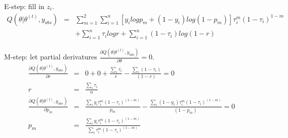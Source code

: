 \documentclass[a4paper,10pt]{article}
\begin{document}
E-step: fill in $z_i$.
\begin{eqnarray*}
Q(\theta | \theta^{(t)}, y_{obs} ) &=& \sum_{m=1}^2 \sum_{i=1}^n [y_i log p_m + (1-y_i) log(1-p_m)] \tau_i^m (1-\tau_i)^{1-m} \\
&& + \sum_{i=1}^n \tau_i log r + \sum_{i=1}^n (1-\tau_i) log (1-r)
\end{eqnarray*}

M-step: let partial derivatures $\frac{\partial Q(\theta | \theta^{(t)}, y_{obs} ) } {\partial \theta} = 0$.
\begin{eqnarray}
\frac{\partial Q(\theta | \theta^{(t)}, y_{obs} ) } {\partial r} & = & 0 + 0 + \frac{\sum_i\tau_i}{r} - \frac{\sum_i(1-\tau_i)}{(1-r)}= 0 \nonumber \\
r & = & \frac{\sum_i \tau_i}{n} \\
\frac{\partial Q(\theta | \theta^{(t)}, y_{obs} ) } {\partial p_m } & = & \frac{\sum_i y_i\tau_i^m (1-\tau_i)^{(1-m)} }{p_m} - \frac{\sum_i (1-y_i)\tau_i^m (1-\tau_i)^{(1-m)}}{(1-p_m)} = 0 \nonumber \\
p_m & = & \frac{\sum_i y_i \tau_i^m (1-\tau_i)^{(1-m)} }{ \sum_i \tau_i^m (1-\tau_i)^{(1-m)} }
\end{eqnarray}
\end{document}
